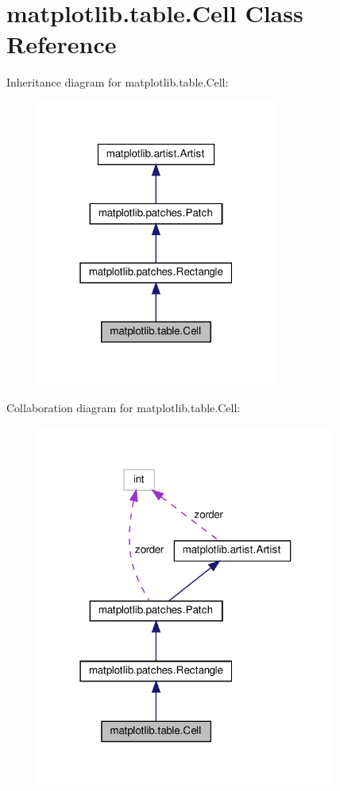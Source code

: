 \hypertarget{classmatplotlib_1_1table_1_1Cell}{}\section{matplotlib.\+table.\+Cell Class Reference}
\label{classmatplotlib_1_1table_1_1Cell}


Inheritance diagram for matplotlib.\+table.\+Cell\+:
\nopagebreak
\begin{figure}[H]
\begin{center}
\leavevmode
\includegraphics[width=223pt]{classmatplotlib_1_1table_1_1Cell__inherit__graph}
\end{center}
\end{figure}


Collaboration diagram for matplotlib.\+table.\+Cell\+:
\nopagebreak
\begin{figure}[H]
\begin{center}
\leavevmode
\includegraphics[width=279pt]{classmatplotlib_1_1table_1_1Cell__coll__graph}
\end{center}
\end{figure}
